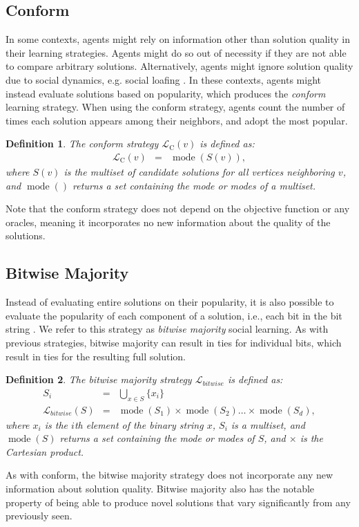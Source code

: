 \documentclass[twocolumn,10pt]{article}
\newtheorem{definition}{Definition}
\DeclareMathOperator{\mode}{mode}
\begin{document}
\subsection{Conform}
In some contexts, agents might rely on information other than solution quality in their learning strategies.
Agents might do so out of necessity if they are not able to compare arbitrary solutions.
Alternatively, agents might ignore solution quality due to social dynamics, e.g. social loafing \cite{karau_social_1993}. In these contexts, agents might instead evaluate solutions based on popularity, which produces the {\em conform} learning strategy.
When using the conform strategy, agents count the number of times each solution appears among their neighbors, and adopt the most popular.
\begin{definition}
The conform strategy $\mathcal{L}_{\text{C}}(v)$ is defined as:
\begin{eqnarray}
\mathcal{L}_{\text{C}}(v) &=&
\mode(S(v)),
\end{eqnarray}
where $S(v)$ is the multiset of candidate solutions for all vertices neighboring $v$, and $\mode()$ returns a set containing the mode or modes of a multiset.
\end{definition}
Note that the conform strategy does not depend on the objective function or any oracles, meaning it incorporates no new information about the quality of the solutions.

\iffalse

\subsection{Bitwise Majority}
Instead of evaluating entire solutions on their popularity, it is also possible to evaluate the popularity of each component of a solution, i.e., each bit in the bit string \cite{platt_network_2018}.
We refer to this strategy as {\em bitwise majority} social learning.
As with previous strategies, bitwise majority can result in ties for individual bits, which result in ties for the resulting full solution.

\begin{definition}
The bitwise majority strategy $\mathcal{L}_{bitwise}$ is defined as:
\begin{eqnarray}
S_i &=& \bigcup_{x \in S} \{x_i\} \\
\mathcal{L}_{bitwise}(S)
&=& \mode(S_1) \times \mode(S_2) \ldots \times \mode(S_d),
\end{eqnarray}
where $x_i$ is the $i$th element of the binary string $x$,
$S_i$ is a multiset, and $\mode(S)$ returns a set containing the mode or modes of $S$, and $\times$ is the Cartesian product.
\end{definition}
As with conform, the bitwise majority strategy does not incorporate any new information about solution quality.
Bitwise majority also has the notable property of being able to produce novel solutions that vary significantly from any previously seen.
\end{document}
